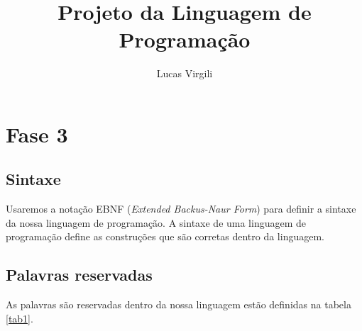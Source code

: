 \documentclass[a4 paper, 12pt]{article}
\title{Projeto da Linguagem de Programa\c c\~ao}
\author{Lucas Virgili}
\date{}
\begin{document}
\maketitle
\tableofcontents
\newpage
\section{Fase 3}
\subsection{Sintaxe}

Usaremos a nota\c c\~ao EBNF (\emph{Extended Backus-Naur Form}) para
definir a sintaxe da nossa linguagem de programa\c c\~ao. A sintaxe de
uma linguagem de programa\c c\~ao define as constru\c c\~oes que s\~ao
corretas dentro da linguagem.

\subsection{Palavras reservadas}

As palavras s\~ao reservadas dentro da nossa linguagem est\~ao
definidas na tabela \ref{tab1}.
\end{document}
